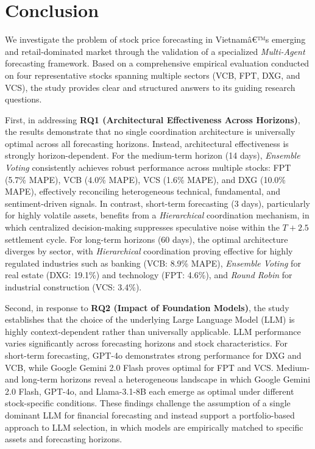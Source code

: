 \documentclass{ieeeaccess}
\begin{document}
\section{Conclusion}

We investigate the problem of stock price forecasting in Vietnamâ€™s emerging and retail-dominated market through the validation of a specialized \textit{Multi-Agent} forecasting framework. Based on a comprehensive empirical evaluation conducted on four representative stocks spanning multiple sectors (VCB, FPT, DXG, and VCS), the study provides clear and structured answers to its guiding research questions.

First, in addressing \textbf{RQ1 (Architectural Effectiveness Across Horizons)}, the results demonstrate that no single coordination architecture is universally optimal across all forecasting horizons. Instead, architectural effectiveness is strongly horizon-dependent. For the medium-term horizon (14 days), \textit{Ensemble Voting} consistently achieves robust performance across multiple stocks: FPT (5.7\% MAPE), VCB (4.0\% MAPE), VCS (1.6\% MAPE), and DXG (10.0\% MAPE), effectively reconciling heterogeneous technical, fundamental, and sentiment-driven signals. In contrast, short-term forecasting (3 days), particularly for highly volatile assets, benefits from a \textit{Hierarchical} coordination mechanism, in which centralized decision-making suppresses speculative noise within the $T+2.5$ settlement cycle. For long-term horizons (60 days), the optimal architecture diverges by sector, with \textit{Hierarchical} coordination proving effective for highly regulated industries such as banking (VCB: 8.9\% MAPE), \textit{Ensemble Voting} for real estate (DXG: 19.1\%) and technology (FPT: 4.6\%), and \textit{Round Robin} for industrial construction (VCS: 3.4\%).

Second, in response to \textbf{RQ2 (Impact of Foundation Models)}, the study establishes that the choice of the underlying Large Language Model (LLM) is highly context-dependent rather than universally applicable. LLM performance varies significantly across forecasting horizons and stock characteristics. For short-term forecasting, GPT-4o demonstrates strong performance for DXG and VCB, while Google Gemini 2.0 Flash proves optimal for FPT and VCS. Medium- and long-term horizons reveal a heterogeneous landscape in which Google Gemini 2.0 Flash, GPT-4o, and Llama-3.1-8B each emerge as optimal under different stock-specific conditions. These findings challenge the assumption of a single dominant LLM for financial forecasting and instead support a portfolio-based approach to LLM selection, in which models are empirically matched to specific assets and forecasting horizons.
\end{document}
